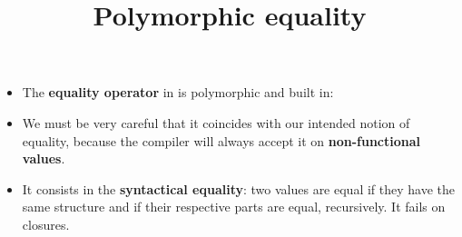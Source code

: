 \documentclass[wide]{slides}
\begin{document}
\begin{slide}
  \title{Polymorphic equality}

  \begin{itemize}

    \item The \textbf{equality operator} in \OCaml is polymorphic and
      built in:

      \smallskip
      \noindent\topin{(=)}

      \noindent{}

      \item We must be very careful that it coincides with our
        intended notion of equality, because the compiler will always
        accept it on \textbf{non\hyp{}functional values}.

      \item It consists in the \textbf{syntactical equality}: two
        values are equal if they have the same structure and if their
        respective parts are equal, recursively. It fails on closures.

        \smallskip

        \noindent{}

        \noindent{}

        \noindent{}


  \end{itemize}

\end{slide}
\end{document}
